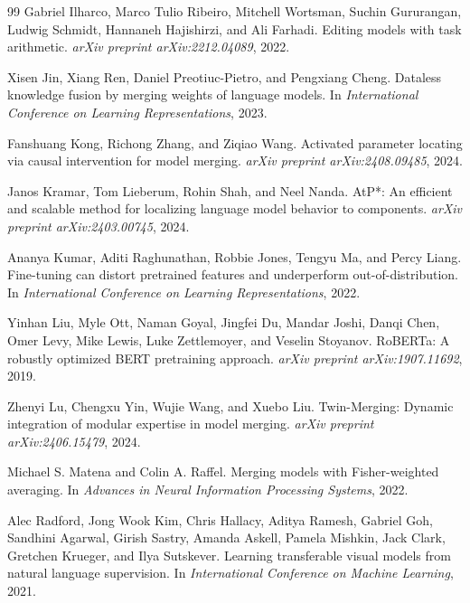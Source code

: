 \documentclass{article} %
\begin{document}
\begin{thebibliography}{99}
Gabriel Ilharco, Marco Tulio Ribeiro, Mitchell Wortsman, Suchin Gururangan, Ludwig Schmidt, Hannaneh Hajishirzi, and Ali Farhadi.
\newblock Editing models with task arithmetic.
\newblock \emph{arXiv preprint arXiv:2212.04089}, 2022.

Xisen Jin, Xiang Ren, Daniel Preotiuc-Pietro, and Pengxiang Cheng.
\newblock Dataless knowledge fusion by merging weights of language models.
\newblock In \emph{International Conference on Learning Representations}, 2023.

Fanshuang Kong, Richong Zhang, and Ziqiao Wang.
\newblock Activated parameter locating via causal intervention for model merging.
\newblock \emph{arXiv preprint arXiv:2408.09485}, 2024.

Janos Kramar, Tom Lieberum, Rohin Shah, and Neel Nanda.
\newblock AtP*: An efficient and scalable method for localizing language model behavior to components.
\newblock \emph{arXiv preprint arXiv:2403.00745}, 2024.

Ananya Kumar, Aditi Raghunathan, Robbie Jones, Tengyu Ma, and Percy Liang.
\newblock Fine-tuning can distort pretrained features and underperform out-of-distribution.
\newblock In \emph{International Conference on Learning Representations}, 2022.

Yinhan Liu, Myle Ott, Naman Goyal, Jingfei Du, Mandar Joshi, Danqi Chen, Omer Levy, Mike Lewis, Luke Zettlemoyer, and Veselin Stoyanov.
\newblock RoBERTa: A robustly optimized BERT pretraining approach.
\newblock \emph{arXiv preprint arXiv:1907.11692}, 2019.

Zhenyi Lu, Chengxu Yin, Wujie Wang, and Xuebo Liu.
\newblock Twin-Merging: Dynamic integration of modular expertise in model merging.
\newblock \emph{arXiv preprint arXiv:2406.15479}, 2024.

Michael S. Matena and Colin A. Raffel.
\newblock Merging models with Fisher-weighted averaging.
\newblock In \emph{Advances in Neural Information Processing Systems}, 2022.

Alec Radford, Jong Wook Kim, Chris Hallacy, Aditya Ramesh, Gabriel Goh, Sandhini Agarwal, Girish Sastry, Amanda Askell, Pamela Mishkin, Jack Clark, Gretchen Krueger, and Ilya Sutskever.
\newblock Learning transferable visual models from natural language supervision.
\newblock In \emph{International Conference on Machine Learning}, 2021.


\end{thebibliography}
\end{document}

